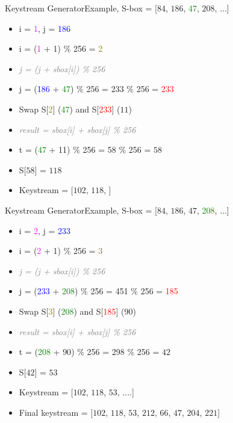 \documentclass[
	aspectratio=169,	%
	onlytextwidth,		%
	t					%
	]{beamer}
\begin{document}
\begin{frame}[fragile]{Keystream Generator}{Example, S-box = [$84$, $186$, \textcolor{green}{47}, $208$, $\dots$]}
	\begin{itemize}[<+->]
		\item i = \textcolor{magenta}{1}, j = \textcolor{blue}{186}
		\item i = (\textcolor{magenta}{1} + 1) $\%$ 256 = \textcolor{olive}{2}
		\item \textit{\textcolor{gray}{j = (j + sbox[i]) \% 256}}
		\item j = (\textcolor{blue}{186} + \textcolor{green}{47}) $\%$ 256 = 233 $\%$ 256 = \textcolor{red}{233}
	\end{itemize}
	\medskip
	\begin{itemize}[<+->]
		\item Swap S[{\textcolor{olive}{2}}] (\textcolor{green}{47}) and S[\textcolor{red}{233}] ($11$)
		\item \textit{\textcolor{gray}{result = sbox[i] + sbox[j] \% 256}}
		\item t = (\textcolor{green}{47} + 11) $\%$ 256 = 58 $\%$ 256 = $58$
		\item S[$58$] = $118$
		\item Keystream = [$102$, $118$, ]
	\end{itemize}
\end{frame}

\begin{frame}[fragile]{Keystream Generator}{Example, S-box = [$84$, $186$, $47$, \textcolor{green}{208}, $\dots$]}
	\begin{itemize}[<+->]
		\item i = \textcolor{magenta}{2}, j = \textcolor{blue}{233}
		\item i = (\textcolor{magenta}{2} + 1) $\%$ 256 = \textcolor{olive}{3}
		\item \textit{\textcolor{gray}{j = (j + sbox[i]) \% 256}}
		\item j = (\textcolor{blue}{233} + \textcolor{green}{208}) $\%$ 256 = 451 $\%$ 256 = \textcolor{red}{185}
	\end{itemize}
	\medskip
	\begin{itemize}[<+->]
		\item Swap S[\textcolor{olive}{3}] (\textcolor{green}{208}) and S[\textcolor{red}{185}] ($90$)
		\item \textit{\textcolor{gray}{result = sbox[i] + sbox[j] \% 256}}
		\item t = (\textcolor{green}{208} + $90$) $\%$ 256 = 298 $\%$ 256 = $42$
		\item S[$42$] = $53$
		\item Keystream = [$102$, $118$, $53$, ....]
		\item Final keystream = [$102$, $118$, $53$, $212$, $66$, $47$, $204$, $221$]
	\end{itemize}
\end{frame}
\end{document}
